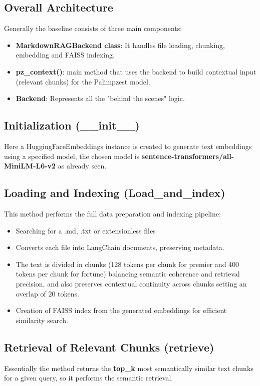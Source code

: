 \documentclass[12pt,a4paper]{article}
\begin{document}
\subsection{Overall Architecture}
Generally the baseline consists of three main components:
\begin{itemize}
    \item \textbf{MarkdownRAGBackend class}: It handles file loading, chunking, embedding and FAISS indexing.
    \item \textbf{pz\_context()}: main method that uses the backend to build contextual input (relevant chunks) for the Palimpzest model.
    \item \textbf{Backend}: Represents all the "behind the scenes" logic.
\end{itemize}

\subsection{Initialization (\_\_init\_\_)}
Here a HuggingFaceEmbeddings instance is created to generate text embeddings using a specified model, the chosen model is \textbf{sentence-transformers/all-MiniLM-L6-v2} as already seen.

\subsection{Loading and Indexing (Load\_and\_index)}
This method performs the full data preparation and indexing pipeline:
\begin{itemize}
    \item Searching for a .md, .txt or extensionless files 
    \item Converts each file into LangChain documents, preserving metadata.
    \item The text is divided in chunks (128 tokens per chunk for premier and 400 tokens per chunk for fortune) balancing semantic coherence and retrieval precision, and also preserves contextual continuity across chunks setting an overlap of 20 tokens.
    \item Creation of FAISS index from the generated embeddings for efficient similarity search.
\end{itemize}

\subsection{Retrieval of Relevant Chunks (retrieve)}
Essentially the method returns the \textbf{top\_k} most semantically similar text chunks for a given query, so it performs the semantic retrieval.
\end{document}
